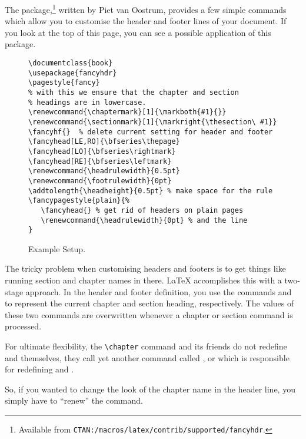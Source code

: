 The  package,\footnote{Available from
  \texttt{CTAN:/macros/latex/contrib/supported/fancyhdr}.} written by
Piet van Oostrum, provides a few simple commands which allow you to
customise the header and footer lines of your document.  If you look
at the top of this page, you can see a possible application of this
package.

\begin{figure}[!htbp]
\begin{lined}{\textwidth}
\begin{verbatim}
\documentclass{book}
\usepackage{fancyhdr}
\pagestyle{fancy}
% with this we ensure that the chapter and section
% headings are in lowercase.
\renewcommand{\chaptermark}[1]{\markboth{#1}{}}
\renewcommand{\sectionmark}[1]{\markright{\thesection\ #1}}
\fancyhf{}  % delete current setting for header and footer
\fancyhead[LE,RO]{\bfseries\thepage}
\fancyhead[LO]{\bfseries\rightmark}
\fancyhead[RE]{\bfseries\leftmark}
\renewcommand{\headrulewidth}{0.5pt}
\renewcommand{\footrulewidth}{0pt}
\addtolength{\headheight}{0.5pt} % make space for the rule
\fancypagestyle{plain}{%
   \fancyhead{} % get rid of headers on plain pages
   \renewcommand{\headrulewidth}{0pt} % and the line
}
\end{verbatim}
\end{lined}
\caption{Example  Setup.} \label{fancyhdr}
\end{figure}

The tricky problem when customising headers and footers is to get
things like running section and chapter names in there. \LaTeX{}
accomplishes this with a two-stage approach. In the header and footer
definition, you use the commands  and  to
represent the current chapter and section heading, respectively.
The values of these two commands are overwritten whenever a chapter or
section command is processed. 

For ultimate flexibility, the \verb|\chapter| command and its friends
do not redefine  and  themselves, they call
yet another command called ,  or
 which is responsible for redefining 
and .

So, if you wanted to change the look of the chapter
name in the header line, you simply have to ``renew'' the 
command. 

